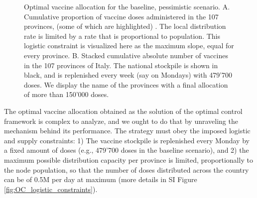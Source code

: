 \begin{figure}[!ht]
    \caption[Optimal vaccine allocation for the baseline, pessimistic scenario. ]{Optimal vaccine allocation for the baseline, pessimistic scenario. \textsc{A.} Cumulative proportion of vaccine doses administered in the 107 provinces, (some of which are highlighted) . The local distribution rate is limited by a rate that is proportional to population. This logistic constraint is visualized here as the maximum slope, equal for every province.
    \textsc{B.} Stacked cumulative absolute number of vaccines in the 107 provinces of Italy. The national stockpile is shown in black, and is replenished every week (say on Mondays) with 479'700 doses. We display the name of the provinces with a final allocation of more than 150'000 doses.}
    \label{fig:OC_stackplot}
\end{figure}

The optimal vaccine allocation obtained as the solution of the optimal control framework is complex to analyze, and we ought to do that by unraveling the mechanism behind its performance.
The strategy must obey the imposed logistic and supply constraints: 1) The vaccine stockpile is replenished every Monday by a fixed amount of doses (e.g., 479'700 doses in the baseline scenario), and 2) the maximum possible distribution capacity per province is limited, proportionally to the node population, so that the number of doses distributed across the country can be of 0.5M per day at maximum (more details in SI Figure \ref{fig:OC_logistic_constraints}). 


